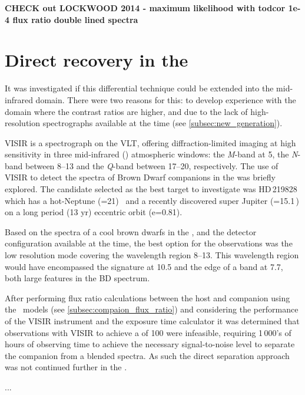 \textbf{
CHECK out LOCKWOOD 2014 - maximum likelihood with todcor 1e-4 flux ratio double lined spectra}




\section{Direct recovery in the \mir{}}
It was investigated if this differential technique could be extended into the mid-infrared {\mir{}} domain.
There were two reasons for this: to develop experience with the {\mir{}} domain where the contrast ratios are higher, and due to the lack of high-resolution \nir{} spectrographs available at the time (see \cref{subsec:new_generation}).

{VISIR} is a \mir{} spectrograph on the {VLT}, offering diffraction-limited imaging at high sensitivity in three mid-infrared (\mir) atmospheric windows: the \emph{M}-band at 5\um{}, the \emph{N}-band between 8--13\um{} and the \emph{Q}-band between 17--20\um{}, respectively.
The use of {VISIR} to detect the spectra of Brown Dwarf companions in the {\mir{}} was briefly explored.
The candidate selected as the best target to investigate was {HD\,219828} which has a hot-Neptune (\Mtwosini{}=21\Mearth)~\citep{melo_new_2007} and a recently discovered super Jupiter (\Mtwosini{}=15.1\,\Mjup) on a long period (13 yr) eccentric orbit (e=0.81)\citep{santos_extreme_2016}.

Based on the spectra of a cool brown dwarfs in the \mir{}, and the detector configuration available at the time, the best option for the observations was the low resolution mode covering the wavelength region 8--13\um{}.
This wavelength region would have encompassed the  signature at 10.5\um{} and the edge of a  band at 7.7\um{}, both large features in the BD \mir{} spectrum.

After performing flux ratio calculations between the host and companion using the~\citet{baraffe_evolutionary_2003} models (see \cref{subsec:compaion_flux_ratio}) and considering the performance of the {VISIR} instrument and the exposure time calculator it was determined that observations with {VISIR} to achieve a \snr{} of 100 were infeasible, requiring 1\,000's of hours of observing time to achieve the necessary signal-to-noise level to separate the companion from a blended spectra.
As such the direct separation approach was not continued further in the \mir{}.



...

